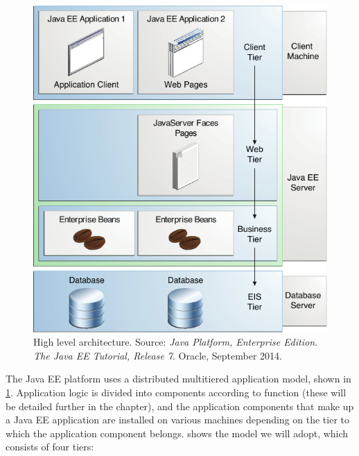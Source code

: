 \begin{figure}%
	\centering%
	\includegraphics[width=0.85\linewidth]{img/JEETT}%
	\caption{High level architecture. Source: \emph{Java Platform, Enterprise Edition. The Java EE Tutorial, Release 7}. Oracle, September 2014.}\label{fig:jeett}%
\end{figure}

The Java EE platform uses a distributed multitiered application model, shown in \cref{fig:jeett}. Application logic is divided into components according to function (these will be detailed further in the chapter), and the application components that make up a Java EE application are installed on various machines depending on the tier to which the application component belongs.  shows the model we will adopt, which consists of four tiers:

